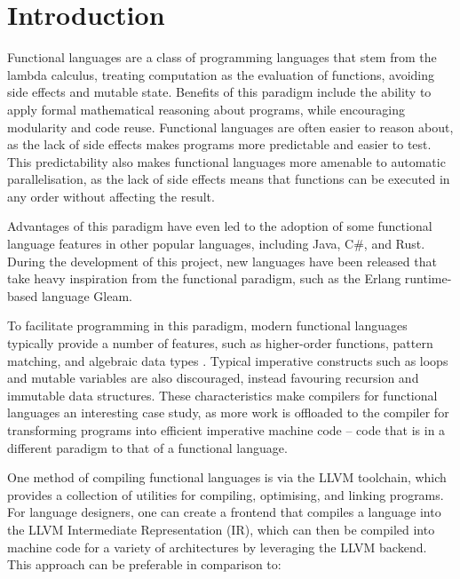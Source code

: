 \chapter{Introduction}

Functional languages are a class of programming languages that stem from the lambda calculus,
treating computation as the evaluation of functions, avoiding side effects and mutable state.
Benefits of this paradigm include the ability to apply formal mathematical reasoning about programs,
while encouraging modularity and code reuse. Functional languages are often easier to reason about,
as the lack of side effects makes programs more predictable and easier to test. This predictability
also makes functional languages more amenable to automatic parallelisation, as the lack of side
effects means that functions can be executed in any order without affecting the result.

Advantages of this paradigm have even led to the adoption of some functional language features in
other popular languages, including Java, C\#, and Rust. During the development of this project, new
languages have been released that take heavy inspiration from the functional paradigm, such as the
Erlang runtime-based language Gleam.

To facilitate programming in this paradigm, modern functional languages typically provide a number
of features, such as higher-order functions, pattern matching, and algebraic data types
\autocite{hudak1989conception}. Typical imperative constructs such as loops and mutable variables
are also discouraged, instead favouring recursion and immutable data structures. These
characteristics make compilers for functional languages an interesting case study, as more work is
offloaded to the compiler for transforming programs into efficient imperative machine code -- code
that is in a different paradigm to that of a functional language.

One method of compiling functional languages is via the LLVM toolchain, which provides a collection
of utilities for compiling, optimising, and linking programs. For language designers, one can create
a frontend that compiles a language into the LLVM Intermediate Representation (IR), which can then
be compiled into machine code for a variety of architectures by leveraging the LLVM backend. This
approach can be preferable in comparison to:

